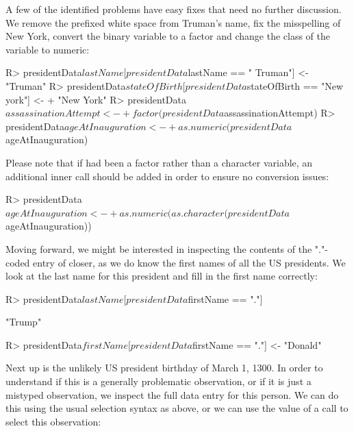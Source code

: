 \documentclass[article,shortnames]{jss}
\begin{document}
A few of the identified problems have easy fixes that need no further discussion. We remove the prefixed white space from Truman's name, fix the misspelling of New York, convert the binary variable  to a factor and change the class of the  variable to numeric:

\begin{Schunk}
\begin{Sinput}
R> presidentData$lastName[presidentData$lastName == " Truman"] <- "Truman"
R> presidentData$stateOfBirth[presidentData$stateOfBirth == "New york"] <- 
+    "New York"
R> presidentData$assassinationAttempt <- 
+    factor(presidentData$assassinationAttempt)
R> presidentData$ageAtInauguration <- 
+    as.numeric(presidentData$ageAtInauguration)
\end{Sinput}
\end{Schunk}

Please note that if  had been a factor rather than a character variable, an additional inner call should be added in order to ensure no conversion issues:

\begin{Schunk}
\begin{Sinput}
R> presidentData$ageAtInauguration <- 
+    as.numeric(as.character(presidentData$ageAtInauguration))
\end{Sinput}
\end{Schunk}

Moving forward, we might be interested in inspecting the contents of the "."-coded entry of  closer, as we do know the first names of all the US presidents. We look at the last name for this president and fill in the first name correctly:

\begin{Schunk}
\begin{Sinput}
R> presidentData$lastName[presidentData$firstName == "."]
\end{Sinput}
\begin{Soutput}
[1] "Trump"
\end{Soutput}
\end{Schunk}

\begin{Schunk}
\begin{Sinput}
R> presidentData$firstName[presidentData$firstName == "."] <- "Donald"
\end{Sinput}
\end{Schunk}

Next up is the unlikely US president birthday of March 1, 1300. In order to understand if this is a generally problematic observation, or if it is just a mistyped observation, we inspect the full data entry for this person. We can do this using the usual  selection syntax as above, or we can use the value of a  call to select this observation:
\end{document}
